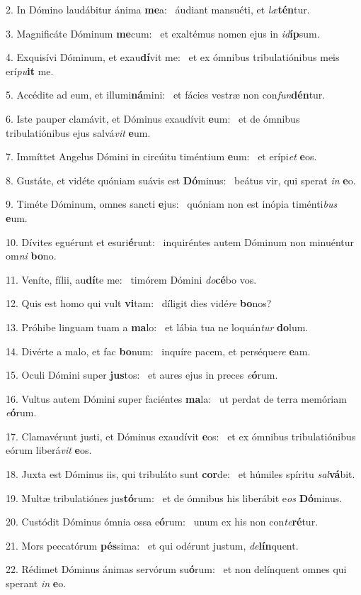 2. In Dómino laudábitur ánima \textbf{me}a: \ast\  áudiant mansuéti, et \textit{læ}\textbf{tén}tur.\

3. Magnificáte Dóminum \textbf{me}cum: \ast\  et exaltémus nomen ejus in \textit{id}\textbf{íp}sum.\

4. Exquisívi Dóminum, et exau\textbf{dí}vit me: \ast\  et ex ómnibus tribulatiónibus meis erí\textit{pu}\textbf{it} me.\

5. Accédite ad eum, et illumi\textbf{ná}mini: \ast\  et fácies vestræ non con\textit{fun}\textbf{dén}tur.\

6. Iste pauper clamávit, et Dóminus exaudívit \textbf{e}um: \ast\  et de ómnibus tribulatiónibus ejus salvá\textit{vit} \textbf{e}um.\

7. Immíttet Angelus Dómini in circúitu timéntium \textbf{e}um: \ast\  et erípi\textit{et} \textbf{e}os.\

8. Gustáte, et vidéte quóniam suávis est \textbf{Dó}minus: \ast\  beátus vir, qui sperat \textit{in} \textbf{e}o.\

9. Timéte Dóminum, omnes sancti \textbf{e}jus: \ast\  quóniam non est inópia timénti\textit{bus} \textbf{e}um.\

10. Dívites eguérunt et esuri\textbf{é}runt: \ast\  inquiréntes autem Dóminum non minuéntur om\textit{ni} \textbf{bo}no.\

11. Veníte, fílii, au\textbf{dí}te me: \ast\  timórem Dómini \textit{do}\textbf{cé}bo vos.\

12. Quis est homo qui vult \textbf{vi}tam: \ast\  díligit dies vidé\textit{re} \textbf{bo}nos?\

13. Próhibe linguam tuam a \textbf{ma}lo: \ast\  et lábia tua ne loquán\textit{tur} \textbf{do}lum.\

14. Divérte a malo, et fac \textbf{bo}num: \ast\  inquíre pacem, et perséque\textit{re} \textbf{e}am.\

15. Oculi Dómini super \textbf{jus}tos: \ast\  et aures ejus in preces \textit{e}\textbf{ó}rum.\

16. Vultus autem Dómini super faciéntes \textbf{ma}la: \ast\  ut perdat de terra memóriam \textit{e}\textbf{ó}rum.\

17. Clamavérunt justi, et Dóminus exaudívit \textbf{e}os: \ast\  et ex ómnibus tribulatiónibus eórum liberá\textit{vit} \textbf{e}os.\

18. Juxta est Dóminus iis, qui tribuláto sunt \textbf{cor}de: \ast\  et húmiles spíritu \textit{sal}\textbf{vá}bit.\

19. Multæ tribulatiónes jus\textbf{tó}rum: \ast\  et de ómnibus his liberábit e\textit{os} \textbf{Dó}minus.\

20. Custódit Dóminus ómnia ossa e\textbf{ó}rum: \ast\  unum ex his non con\textit{te}\textbf{ré}tur.\

21. Mors peccatórum \textbf{pés}sima: \ast\  et qui odérunt justum, \textit{de}\textbf{lín}quent.\

22. Rédimet Dóminus ánimas servórum su\textbf{ó}rum: \ast\  et non delínquent omnes qui sperant \textit{in} \textbf{e}o.\

